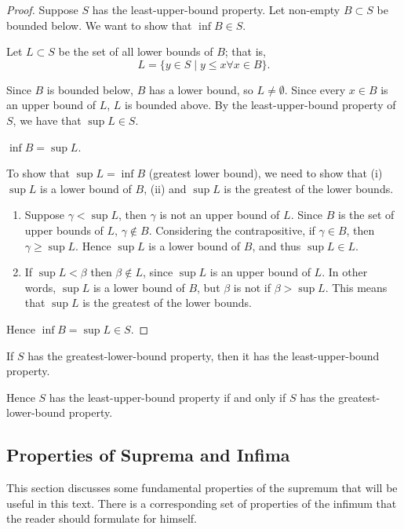 \begin{proof}
Suppose $S$ has the least-upper-bound property. Let non-empty $B\subset S$ be bounded below. We want to show that $\inf B\in S$.

Let $L\subset S$ be the set of all lower bounds of $B$; that is,
\[L=\{y\in S\mid y\le x\forall x\in B\}.\]

Since $B$ is bounded below, $B$ has a lower bound, so $L\neq\emptyset$. Since every $x\in B$ is an upper bound of $L$, $L$ is bounded above. By the least-upper-bound property of $S$, we have that $\sup L\in S$.

\begin{claim}
$\inf B=\sup L$.
\end{claim}

To show that $\sup L=\inf B$ (greatest lower bound), we need to show that (i) $\sup L$ is a lower bound of $B$, (ii) and $\sup L$ is the greatest of the lower bounds.
\begin{enumerate}[label=(\roman*)]
\item Suppose $\gamma<\sup L$, then $\gamma$ is not an upper bound of $L$. Since $B$ is the set of upper bounds of $L$, $\gamma\notin B$. Considering the contrapositive, if $\gamma\in B$, then $\gamma\ge\sup L$. Hence $\sup L$ is a lower bound of $B$, and thus $\sup L\in L$.
\item If $\sup L<\beta$ then $\beta\notin L$, since $\sup L$ is an upper bound of $L$. In other words, $\sup L$ is a lower bound of $B$, but $\beta$ is not if $\beta>\sup L$. This means that $\sup L$ is the greatest of the lower bounds.
\end{enumerate}
Hence $\inf B=\sup L\in S$.
\end{proof}

\begin{corollary}
If $S$ has the greatest-lower-bound property, then it has the least-upper-bound property.

Hence $S$ has the least-upper-bound property if and only if $S$ has the greatest-lower-bound property.
\end{corollary}

\subsection{Properties of Suprema and Infima}
This section discusses some fundamental properties of the supremum that will be useful in this text. There is a corresponding set of properties of the infimum that the reader should formulate for himself.

